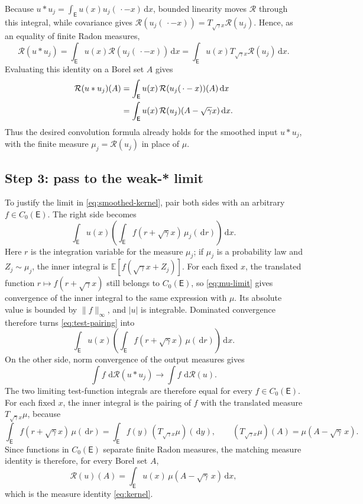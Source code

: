 \documentclass[11pt]{article}
\newcommand{\dd}{\,\mathrm d}
\begin{document}
Because $u*u_j=\int_{\mathsf E}u(x)u_j(\,\cdot-x)\dd x$, bounded linearity moves
$\mathcal R$ through this integral, while covariance gives
$\mathcal R(u_j(\,\cdot-x))=T_{\sqrt\gamma x}\mathcal R(u_j)$.  Hence, as
an equality of finite Radon measures,
\[
  \mathcal R(u*u_j)
  =\int_{\mathsf E}u(x)\mathcal R(u_j(\,\cdot-x))\dd x
  =\int_{\mathsf E}u(x)T_{\sqrt\gamma x}\mathcal R(u_j)\dd x.
\]
Evaluating this identity on a Borel set $A$ gives
\begin{align}
  \mathcal R(u*u_j)(A)
  &=\int_{\mathsf E}u(x)\,
    \mathcal R(u_j(\,\cdot-x))(A)\dd x\notag\\
  &=\int_{\mathsf E}u(x)\,
    \mathcal R(u_j)(A-\sqrt\gamma x)\dd x.
  \label{eq:smoothed-kernel}
\end{align}
Thus the desired convolution formula already holds for the smoothed input
$u*u_j$, with the finite measure $\mu_j=\mathcal R(u_j)$ in place of $\mu$.

\subsection*{Step 3: pass to the weak-* limit}

To justify the limit in \eqref{eq:smoothed-kernel}, pair both sides with an
arbitrary $f\in C_0(\mathsf E)$.  The right side becomes
\begin{equation}\label{eq:test-pairing}
  \int_{\mathsf E}u(x)
  \left(\int_{\mathsf E}f(r+\sqrt\gamma x)\,\mu_j(\dd r)\right)\dd x.
\end{equation}
Here $r$ is the integration variable for the measure $\mu_j$; if $\mu_j$
is a probability law and $Z_j\sim\mu_j$, the inner integral is
$\mathbb E[f(\sqrt\gamma x+Z_j)]$.
For each fixed $x$, the translated function
$r\mapsto f(r+\sqrt\gamma x)$ still belongs to $C_0(\mathsf E)$, so
\eqref{eq:mu-limit} gives convergence of the inner integral to the same
expression with $\mu$.  Its absolute value is bounded by $\|f\|_\infty$, and
$|u|$ is integrable.  Dominated convergence therefore turns
\eqref{eq:test-pairing} into
\[
  \int_{\mathsf E}u(x)
  \left(\int_{\mathsf E}f(r+\sqrt\gamma x)\,\mu(\dd r)\right)\dd x.
\]
On the other side, norm convergence of the output measures gives
\[
  \int f\,\dd\mathcal R(u*u_j)
  \longrightarrow
  \int f\,\dd\mathcal R(u).
\]
The two limiting test-function integrals are therefore equal for every
$f\in C_0(\mathsf E)$.  For each fixed $x$, the inner integral is the pairing of
$f$ with the translated measure $T_{\sqrt\gamma x}\mu$, because
\[
  \int_{\mathsf E}f(r+\sqrt\gamma x)\,\mu(\dd r)
  =\int_{\mathsf E}f(y)\,(T_{\sqrt\gamma x}\mu)(\dd y),
  \qquad
  (T_{\sqrt\gamma x}\mu)(A)=\mu(A-\sqrt{\gamma}\,x).
\]
Since functions in $C_0(\mathsf E)$ separate finite Radon measures, the matching
measure identity is therefore, for every Borel set $A$,
\[
  \mathcal R(u)(A)
  =\int_{\mathsf E}u(x)\,\mu(A-\sqrt{\gamma}\,x)\dd x,
\]
which is the measure identity \eqref{eq:kernel}.
\end{document}
